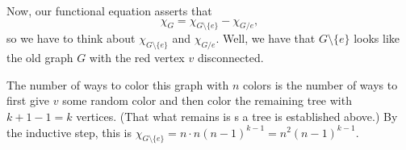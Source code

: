 Now, our functional equation asserts that
\[\chi_G=\chi_{G\setminus\{e\}}-\chi_{G/e},\]
so we have to think about $\chi_{G\setminus\{e\}}$ and $\chi_{G/e}.$ Well, we have that $G\setminus\{e\}$ looks like the old graph $G$ with the red vertex $v$ disconnected.
\begin{center}
\end{center}
The number of ways to color this graph with $n$ colors is the number of ways to first give $v$ some random color and then color the remaining tree with $k+1-1=k$ vertices. (That what remains is s a tree is established above.) By the inductive step, this is $\chi_{G\setminus\{e\}}=n\cdot n(n-1)^{k-1}=n^2(n-1)^{k-1}.$

